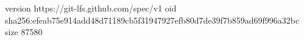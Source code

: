 version https://git-lfs.github.com/spec/v1
oid sha256:efeab75e914add48d71189cb5f31947927efb80d7de39f7b859ad69f996a32bc
size 87580
